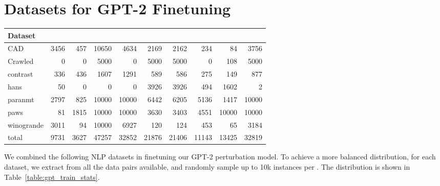 \section{Datasets for GPT-2 Finetuning}
\label{appendix:train_data}

\begin{table*}
\small
\centering
\setlength{\tabcolsep}{3.5pt}
\begin{tabular}{lrrrrrrrrr}
\toprule
\textbf{Dataset} & \textbf{\ctrltag{negation}} & \textbf{\ctrltag{quantifier}} & \textbf{\ctrltag{leixcal}} & \textbf{\ctrltag{resemantic}} & \textbf{\ctrltag{insert}} & \textbf{\ctrltag{delete}} & \textbf{\ctrltag{restructure}} & \textbf{\ctrltag{shuffle}} & \emph{\ctrltag{global}} \\ 
\midrule
        CAD &      3456 &         457 &    10650 &        4634 &    2169 &    2162 &          234 &       84 &    3756 \\
    Crawled &         0 &           0 &     5000 &           0 &    5000 &    5000 &            0 &      108 &    5000 \\
   contrast &       336 &         436 &     1607 &        1291 &     589 &     586 &          275 &      149 &     877 \\
       hans &        50 &           0 &        0 &           0 &    3926 &    3926 &          494 &     1602 &       2 \\
    paranmt &      2797 &         825 &    10000 &       10000 &    6442 &    6205 &         5136 &     1417 &   10000 \\
       paws &        81 &        1815 &    10000 &       10000 &    3630 &    3403 &         4551 &    10000 &   10000 \\
 winogrande &      3011 &          94 &    10000 &        6927 &     120 &     124 &          453 &       65 &    3184 \\
      total &      9731 &        3627 &    47257 &       32852 &   21876 &   21406 &        11143 &    13425 &   32819 \\
\bottomrule
\end{tabular}
\caption{The datasets used for finetuning the GPT-2 perturbation model, and the \tagstr distributions.}
\label{table:gpt_train_stats}
\end{table*}


We combined the following NLP datasets in finetuning our GPT-2 perturbation model.
To achieve a more balanced distribution, for each dataset, we extract \tagstrs from all the data pairs available, and randomly sample up to 10k instances per \tagstr.
The distribution is shown in Table~\ref{table:gpt_train_stats}.

